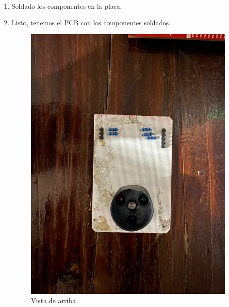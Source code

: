 \documentclass[12pt]{report}
\begin{document}
\begin{enumerate}
  \item Soldado los componentes en la placa.
  \item Listo, tenemos el PCB con los componentes soldados.
  \begin{figure}[H]
    \centering
    \begin{minipage}{0.45\textwidth}
      \centering
      \includegraphics[width=\textwidth]{screenshots/PlacaArriba.jpeg}
      \caption{Vista de arriba}
      \label{fig:imagen1}
    \end{minipage}\hfill
    \begin{minipage}{0.45\textwidth}
      \centering

\end{minipage}
\end{figure}
\end{enumerate}
\end{document}
